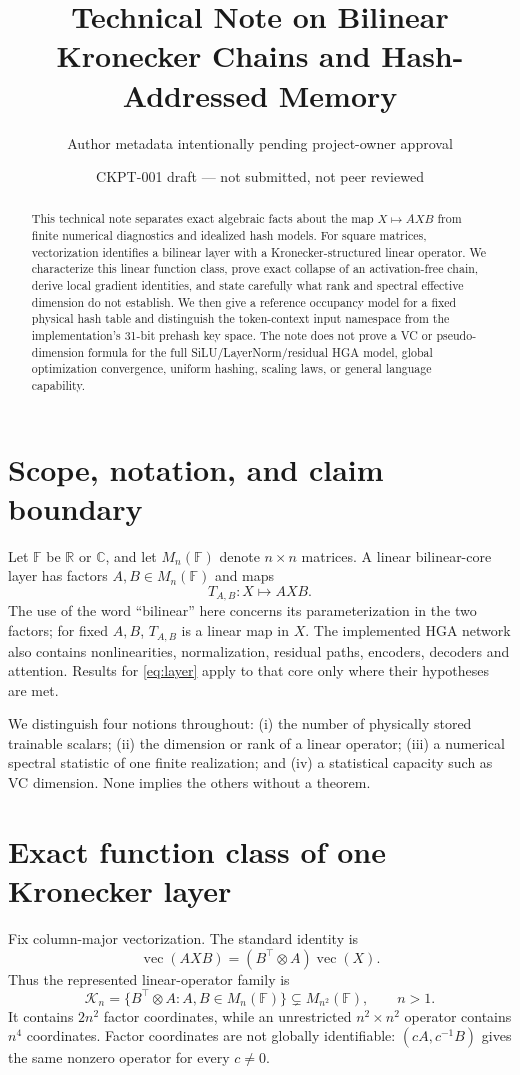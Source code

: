 \documentclass[11pt]{article}
\title{Technical Note on Bilinear Kronecker Chains and Hash-Addressed Memory}
\author{Author metadata intentionally pending project-owner approval}
\date{CKPT-001 draft --- not submitted, not peer reviewed}
\begin{document}
\maketitle

\begin{abstract}
This technical note separates exact algebraic facts about the map
$X\mapsto AXB$ from finite numerical diagnostics and idealized hash models.
For square matrices, vectorization identifies a bilinear layer with a
Kronecker-structured linear operator. We characterize this linear function
class, prove exact collapse of an activation-free chain, derive local gradient
identities, and state carefully what rank and spectral effective dimension do
not establish. We then give a reference occupancy model for a fixed physical
hash table and distinguish the token-context input namespace from the
implementation's 31-bit prehash key space. The note does not prove a VC or
pseudo-dimension formula for the full SiLU/LayerNorm/residual HGA model, global
optimization convergence, uniform hashing, scaling laws, or general language
capability.
\end{abstract}

\section{Scope, notation, and claim boundary}
Let $\mathbb F$ be $\mathbb R$ or $\mathbb C$, and let $M_n(\mathbb F)$ denote
$n\times n$ matrices. A linear bilinear-core layer has factors $A,B\in
M_n(\mathbb F)$ and maps
\begin{equation}\label{eq:layer}
  T_{A,B}:X\longmapsto AXB.
\end{equation}
The use of the word ``bilinear'' here concerns its parameterization in the two
factors; for fixed $A,B$, $T_{A,B}$ is a linear map in $X$. The implemented HGA
network also contains nonlinearities, normalization, residual paths, encoders,
decoders and attention. Results for \eqref{eq:layer} apply to that core only
where their hypotheses are met.

We distinguish four notions throughout: (i) the number of physically stored
trainable scalars; (ii) the dimension or rank of a linear operator; (iii) a
numerical spectral statistic of one finite realization; and (iv) a statistical
capacity such as VC dimension. None implies the others without a theorem.

\section{Exact function class of one Kronecker layer}
Fix column-major vectorization. The standard identity is
\begin{equation}\label{eq:vec}
  \operatorname{vec}(AXB)=(B^\top\otimes A)\operatorname{vec}(X).
\end{equation}
Thus the represented linear-operator family is
\[
  \mathcal K_n=\{B^\top\otimes A:A,B\in M_n(\mathbb F)\}
  \subsetneq M_{n^2}(\mathbb F),\qquad n>1.
\]
It contains $2n^2$ factor coordinates, while an unrestricted $n^2\times n^2$
operator contains $n^4$ coordinates. Factor coordinates are not globally
identifiable: $(cA,c^{-1}B)$ gives the same nonzero operator for every
$c\ne0$.
\end{document}
